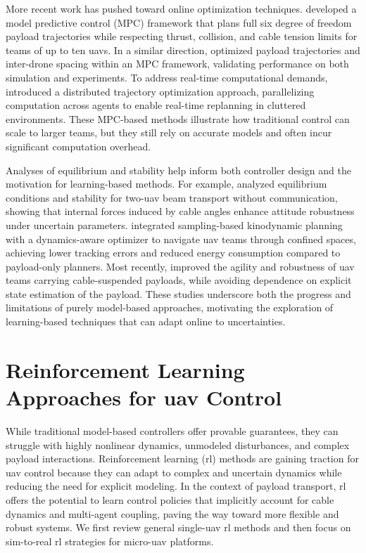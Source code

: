 More recent work has pushed toward online optimization techniques. \cite{sun_nonlinear_2023} developed a model predictive control (MPC) framework that plans full six degree of freedom payload trajectories while respecting thrust, collision, and cable tension limits for teams of up to ten \glspl{uav}. In a similar direction, \cite{li_nonlinear_2023} optimized payload trajectories and inter-drone spacing within an MPC framework, validating performance on both simulation and experiments. To address real-time computational demands, \cite{jackson_scalable_2020} introduced a distributed trajectory optimization approach, parallelizing computation across agents to enable real-time replanning in cluttered environments. These MPC-based methods illustrate how traditional control can scale to larger teams, but they still rely on accurate models and often incur significant computation overhead.

Analyses of equilibrium and stability help inform both controller design and the motivation for learning-based methods. For example, \cite{gabellieri_equilibria_2023} analyzed equilibrium conditions and stability for two-\gls{uav} beam transport without communication, showing that internal forces induced by cable angles enhance attitude robustness under uncertain parameters. \cite{wahba_kinodynamic_2024} integrated sampling-based kinodynamic planning with a dynamics-aware optimizer to navigate \gls{uav} teams through confined spaces, achieving lower tracking errors and reduced energy consumption compared to payload-only planners. Most recently, \cite{Wang2025SafeAA} improved the agility and robustness of \gls{uav} teams carrying cable-suspended payloads, while avoiding dependence on explicit state estimation of the payload. These studies underscore both the progress and limitations of purely model-based approaches, motivating the exploration of learning-based techniques that can adapt online to uncertainties.

\section{Reinforcement Learning Approaches for \gls{uav} Control}
While traditional model-based controllers offer provable guarantees, they can struggle with highly nonlinear dynamics, unmodeled disturbances, and complex payload interactions. Reinforcement learning (\gls{rl}) methods are gaining traction for \gls{uav} control because they can adapt to complex and uncertain dynamics while reducing the need for explicit modeling. In the context of payload transport, \gls{rl} offers the potential to learn control policies that implicitly account for cable dynamics and multi-agent coupling, paving the way toward more flexible and robust systems. We first review general single-\gls{uav} \gls{rl} methods and then focus on sim-to-real \gls{rl} strategies for micro-\gls{uav} platforms.

